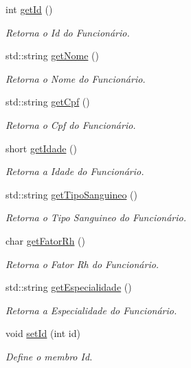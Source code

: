 \begin{DoxyCompactItemize}
int \hyperlink{classFuncionario_a0288286a907e587b7ab75d6c23354a06}{get\+Id} ()
\begin{DoxyCompactList}\small\item\em Retorna o Id do Funcionário. \end{DoxyCompactList}\item 
std\+::string \hyperlink{classFuncionario_a35376709ae5c7357e79ca612a74e7f15}{get\+Nome} ()
\begin{DoxyCompactList}\small\item\em Retorna o Nome do Funcionário. \end{DoxyCompactList}\item 
std\+::string \hyperlink{classFuncionario_aad99a1c5373c00bf5ad161aad1b18a4f}{get\+Cpf} ()
\begin{DoxyCompactList}\small\item\em Retorna o Cpf do Funcionário. \end{DoxyCompactList}\item 
short \hyperlink{classFuncionario_ac8b1947b4cb1c1216291c4750670fba2}{get\+Idade} ()
\begin{DoxyCompactList}\small\item\em Retorna a Idade do Funcionário. \end{DoxyCompactList}\item 
std\+::string \hyperlink{classFuncionario_a871dfd5403d3d3c026c35b62ee2bb6a9}{get\+Tipo\+Sanguineo} ()
\begin{DoxyCompactList}\small\item\em Retorna o Tipo Sanguineo do Funcionário. \end{DoxyCompactList}\item 
char \hyperlink{classFuncionario_a87dc4304683c4a4492a5ecd516d29f44}{get\+Fator\+Rh} ()
\begin{DoxyCompactList}\small\item\em Retorna o Fator Rh do Funcionário. \end{DoxyCompactList}\item 
std\+::string \hyperlink{classFuncionario_a98b261893ff916049db28530d3ba1160}{get\+Especialidade} ()
\begin{DoxyCompactList}\small\item\em Retorna a Especialidade do Funcionário. \end{DoxyCompactList}\item 
void \hyperlink{classFuncionario_acc0b430d08b2c459682d7bb01c0ab1c4}{set\+Id} (int id)
\begin{DoxyCompactList}\small\item\em Define o membro Id. \end{DoxyCompactList}\item 

\end{DoxyCompactItemize}

